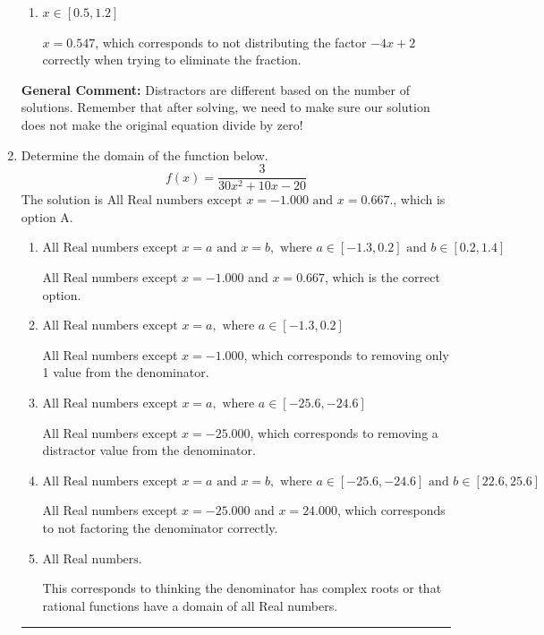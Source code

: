 \documentclass{extbook}[14pt]
\newcommand{\litem}[1]{\item #1

\rule{\textwidth}{0.4pt}}
\begin{document}
\begin{enumerate}
{\begin{enumerate}[label=\Alph*.]
* $x = 1.547$, which is the correct option.
\item \( x \in [0.5,1.2] \)

$x = 0.547$, which corresponds to not distributing the factor $-4x + 2$ correctly when trying to eliminate the fraction.
\end{enumerate}

\textbf{General Comment:} Distractors are different based on the number of solutions. Remember that after solving, we need to make sure our solution does not make the original equation divide by zero!
}
\litem{
Determine the domain of the function below.
\[ f(x) = \frac{3}{30x^{2} +10 x -20} \]The solution is \( \text{All Real numbers except } x = -1.000 \text{ and } x = 0.667. \), which is option A.\begin{enumerate}[label=\Alph*.]
\item \( \text{All Real numbers except } x = a \text{ and } x = b, \text{ where } a \in [-1.3, 0.2] \text{ and } b \in [0.2, 1.4] \)

All Real numbers except $x = -1.000$ and $x = 0.667$, which is the correct option.
\item \( \text{All Real numbers except } x = a, \text{ where } a \in [-1.3, 0.2] \)

All Real numbers except $x = -1.000$, which corresponds to removing only 1 value from the denominator.
\item \( \text{All Real numbers except } x = a, \text{ where } a \in [-25.6, -24.6] \)

All Real numbers except $x = -25.000$, which corresponds to removing a distractor value from the denominator.
\item \( \text{All Real numbers except } x = a \text{ and } x = b, \text{ where } a \in [-25.6, -24.6] \text{ and } b \in [22.6, 25.6] \)

All Real numbers except $x = -25.000$ and $x = 24.000$, which corresponds to not factoring the denominator correctly.
\item \( \text{All Real numbers.} \)

This corresponds to thinking the denominator has complex roots or that rational functions have a domain of all Real numbers.
\end{enumerate}

}
\end{enumerate}
\end{document}
